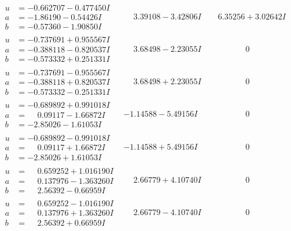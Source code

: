 \documentclass[1p]{elsarticle_modified}
\theoremstyle{definition}
\begin{document}
$$\begin{array}{c|c|c}
\begin{aligned}
u &= -0.662707 - 0.477450 I \\
a &= -1.86190 - 0.54426 I \\
b &= -0.57360 - 1.90850 I\end{aligned}
 & \phantom{-}3.39108 - 3.42806 I & \phantom{-}6.35256 + 3.02642 I \\ \hline\begin{aligned}
u &= -0.737691 + 0.955567 I \\
a &= -0.388118 - 0.820537 I \\
b &= -0.573332 + 0.251331 I\end{aligned}
 & \phantom{-}3.68498 - 2.23055 I & \phantom{-0.000000 } 0 \\ \hline\begin{aligned}
u &= -0.737691 - 0.955567 I \\
a &= -0.388118 + 0.820537 I \\
b &= -0.573332 - 0.251331 I\end{aligned}
 & \phantom{-}3.68498 + 2.23055 I & \phantom{-0.000000 } 0 \\ \hline\begin{aligned}
u &= -0.689892 + 0.991018 I \\
a &= \phantom{-}0.09117 - 1.66872 I \\
b &= -2.85026 - 1.61053 I\end{aligned}
 & -1.14588 - 5.49156 I & \phantom{-0.000000 } 0 \\ \hline\begin{aligned}
u &= -0.689892 - 0.991018 I \\
a &= \phantom{-}0.09117 + 1.66872 I \\
b &= -2.85026 + 1.61053 I\end{aligned}
 & -1.14588 + 5.49156 I & \phantom{-0.000000 } 0 \\ \hline\begin{aligned}
u &= \phantom{-}0.659252 + 1.016190 I \\
a &= \phantom{-}0.137976 - 1.363260 I \\
b &= \phantom{-}2.56392 - 0.66959 I\end{aligned}
 & \phantom{-}2.66779 + 4.10740 I & \phantom{-0.000000 } 0 \\ \hline\begin{aligned}
u &= \phantom{-}0.659252 - 1.016190 I \\
a &= \phantom{-}0.137976 + 1.363260 I \\
b &= \phantom{-}2.56392 + 0.66959 I\end{aligned}
 & \phantom{-}2.66779 - 4.10740 I & \phantom{-0.000000 } 0\\

\end{array}$$
\end{document}
